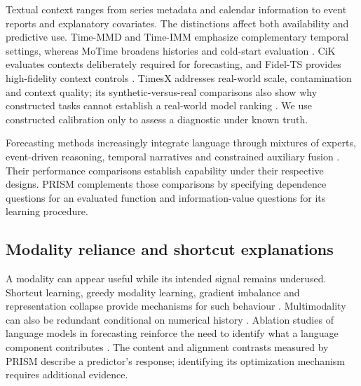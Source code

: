 \documentclass[preprint,11pt]{elsarticle}
\newcommand{\prism}{\textsc{PRISM}}
\begin{document}
Textual context ranges from series metadata and calendar information to event reports and explanatory covariates. The distinctions affect both availability and predictive use. Time-MMD and Time-IMM emphasize complementary temporal settings, whereas MoTime broadens histories and cold-start evaluation \cite{liu2024timemmd,chang2025timeimm,zhou2025motime}. CiK evaluates contexts deliberately required for forecasting, and Fidel-TS provides high-fidelity context controls \cite{williams2025context,xu2025fidelts}. TimesX addresses real-world scale, contamination and context quality; its synthetic-versus-real comparisons also show why constructed tasks cannot establish a real-world model ranking \cite{liu2026timesx}. We use constructed calibration only to assess a diagnostic under known truth.

Forecasting methods increasingly integrate language through mixtures of experts, event-driven reasoning, temporal narratives and constrained auxiliary fusion \cite{lin2026timi,wang2026vot,li2026tats,lee2026cfa}. Their performance comparisons establish capability under their respective designs. \prism{} complements those comparisons by specifying dependence questions for an evaluated function and information-value questions for its learning procedure.

\subsection{Modality reliance and shortcut explanations}

A modality can appear useful while its intended signal remains underused. Shortcut learning, greedy modality learning, gradient imbalance and representation collapse provide mechanisms for such behaviour \cite{geirhos2020shortcut,wu2022greedy,peng2022ogm,chaudhuri2025collapse}. Multimodality can also be redundant conditional on numerical history \cite{zhang2025when}. Ablation studies of language models in forecasting reinforce the need to identify what a language component contributes \cite{tan2024llmuseful}. The content and alignment contrasts measured by \prism{} describe a predictor's response; identifying its optimization mechanism requires additional evidence.
\end{document}
